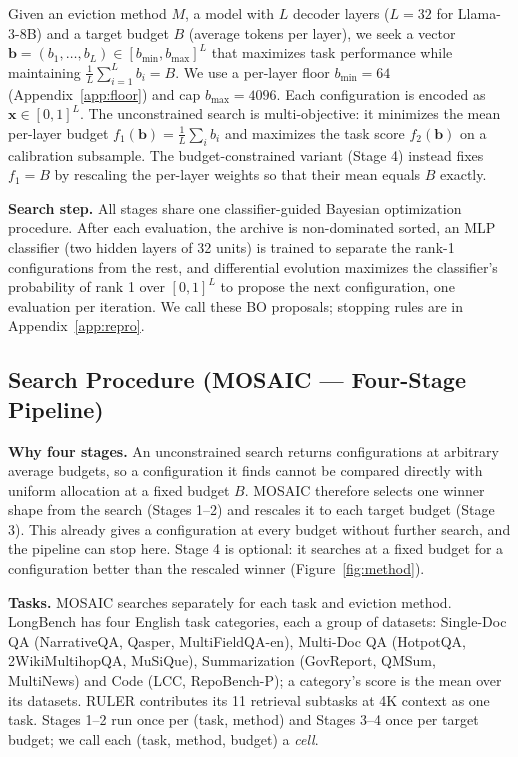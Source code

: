 \documentclass[11pt]{article}
\begin{document}
Given an eviction method $M$, a model with $L$ decoder layers ($L = 32$ for Llama-3-8B) and a target budget $B$ (average tokens per layer), we seek a vector $\mathbf{b} = (b_1, \ldots, b_L) \in [b_{\min}, b_{\max}]^L$ that maximizes task performance while maintaining $\frac{1}{L}\sum_{i=1}^{L} b_i = B$. We use a per-layer floor $b_{\min} = 64$ (Appendix~\ref{app:floor}) and cap $b_{\max} = 4096$. Each configuration is encoded as $\mathbf{x} \in [0,1]^L$. The unconstrained search is multi-objective: it minimizes the mean per-layer budget $f_1(\mathbf{b}) = \frac{1}{L}\sum_i b_i$ and maximizes the task score $f_2(\mathbf{b})$ on a calibration subsample. The budget-constrained variant (Stage 4) instead fixes $f_1 = B$ by rescaling the per-layer weights so that their mean equals $B$ exactly.

\textbf{Search step.} All stages share one classifier-guided Bayesian optimization procedure. After each evaluation, the archive is non-dominated sorted, an MLP classifier (two hidden layers of 32 units) is trained to separate the rank-1 configurations from the rest, and differential evolution maximizes the classifier's probability of rank 1 over $[0,1]^L$ to propose the next configuration, one evaluation per iteration. We call these BO proposals; stopping rules are in Appendix~\ref{app:repro}.

\subsection{Search Procedure (MOSAIC — Four-Stage Pipeline)}

\textbf{Why four stages.} An unconstrained search returns configurations at arbitrary average budgets, so a configuration it finds cannot be compared directly with uniform allocation at a fixed budget $B$. MOSAIC therefore selects one winner shape from the search (Stages 1--2) and rescales it to each target budget (Stage 3). This already gives a configuration at every budget without further search, and the pipeline can stop here. Stage 4 is optional: it searches at a fixed budget for a configuration better than the rescaled winner (Figure~\ref{fig:method}).

\textbf{Tasks.}\label{sec:method-tasks} MOSAIC searches separately for each task and eviction method. LongBench has four English task categories, each a group of datasets: Single-Doc QA (NarrativeQA, Qasper, MultiFieldQA-en), Multi-Doc QA (HotpotQA, 2WikiMultihopQA, MuSiQue), Summarization (GovReport, QMSum, MultiNews) and Code (LCC, RepoBench-P); a category's score is the mean over its datasets. RULER contributes its 11 retrieval subtasks at 4K context as one task. Stages 1--2 run once per (task, method) and Stages 3--4 once per target budget; we call each (task, method, budget) a \emph{cell}.
\end{document}
